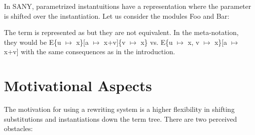 \documentclass[a4paper]{article}
\theoremstyle{definition}
\begin{document}
In SANY, parametrized instantuitions have a representation where the
parameter is shifted over the instantiation. Let us consider the
modules Foo and Bar:

\begin{parcolumns}{2}
\end{parcolumns}

The term  is represented as  but they are
not equivalent. In the meta-notation, they would be
E\{u $\mapsto$ x\}[a $\mapsto$ x+v]\{v $\mapsto$ x\} vs. E\{u $\mapsto$ x,
v $\mapsto$ x\}[a $\mapsto$ x+v] with the same consequences as in the
introduction.

\vspace{2cm}

\newpage
\appendix
\section{Motivational Aspects}
The motivation for using a rewriting system is a higher flexibility in shifting
 substitutions and instantiations down the term tree. There are two perceived
 obstacles:
\end{document}
